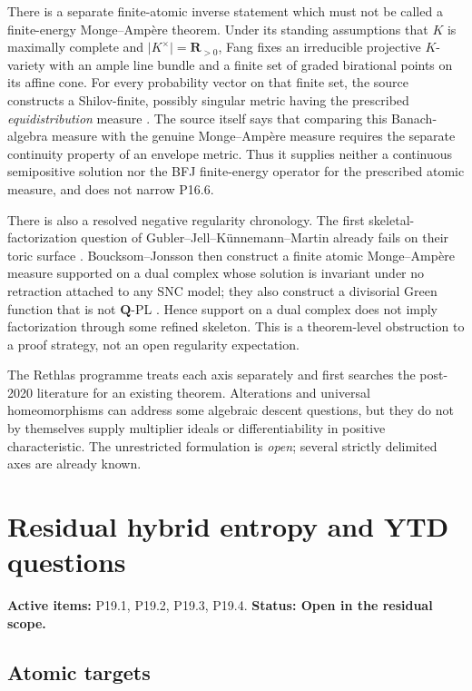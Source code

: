 \documentclass[11pt,a4paper]{article}
\theoremstyle{definition}
\theoremstyle{remark}
\renewcommand{\index}[1]{}
\begin{document}
There is a separate finite-atomic inverse statement which must not be
called a finite-energy Monge--Amp\`ere theorem.  Under its standing
assumptions that \(K\) is maximally complete and
\(\lvert K^\times\rvert=\mathbf R_{>0}\), Fang fixes an irreducible
projective \(K\)-variety with an ample line bundle and a finite set of graded
birational points on its affine cone.  For every probability vector on that
finite set, the source constructs a Shilov-finite, possibly singular metric
having the prescribed \emph{equidistribution} measure
\cite[Proposition~4.8]{Fang25Shilov}.  The source itself says that comparing
this Banach-algebra measure with the genuine Monge--Amp\`ere measure requires
the separate continuity property of an envelope metric.  Thus it supplies
neither a continuous semipositive solution nor the BFJ finite-energy operator
for the prescribed atomic measure, and does not narrow P16.6.

\index{Monge--Amp\`ere equation!skeletal factorization}
There is also a resolved negative regularity chronology.  The first
skeletal-factorization question of Gubler--Jell--K\"unnemann--Martin already
fails on their toric surface \cite[Appendix~A]{GJKM19}.
Boucksom--Jonsson then construct a finite
atomic Monge--Amp\`ere measure supported on a dual complex whose solution is
invariant under no retraction attached to any SNC model; they also construct
a divisorial Green function that is not \(\mathbf Q\)-PL
\cite[Theorems~A and~B]{BJGreen24}.  Hence support on a dual complex does not
imply factorization through some refined skeleton.  This is a theorem-level
obstruction to a proof strategy, not an open regularity expectation.

The Rethlas programme treats each axis separately and first searches the
post-2020 literature for an existing theorem.  Alterations and universal
homeomorphisms can address some algebraic descent questions, but they do not
by themselves supply multiplier ideals or differentiability in positive
characteristic.  The unrestricted formulation is \emph{open}; several
strictly delimited axes are already known.

\clearpage\section{Residual hybrid entropy and YTD questions}
\label{family:11}
\noindent\textbf{Active items:} P19.1, P19.2, P19.3, P19.4. \textbf{Status: Open in the residual scope.}

\subsection{Atomic targets}
\end{document}
